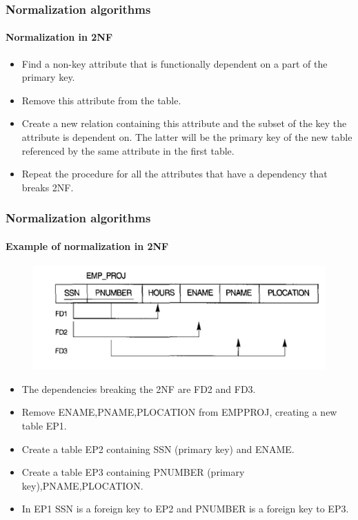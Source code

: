 \documentclass{beamer}
\begin{document}
\begin{frame}
	\frametitle{Normalization algorithms}
	\framesubtitle{Normalization in 2NF}
	
	\begin{itemize}
		\item Find a non-key attribute that is functionally dependent on a part of the primary key.
		\item Remove this attribute from the table.
		\item Create a new relation containing this attribute and the subset of the key the attribute is dependent on. The latter will be the primary key of the new table referenced by the same attribute in the first table.
		\item Repeat the procedure for all the attributes that have a dependency that breaks 2NF.		
	\end{itemize}
\end{frame}

\begin{frame}
	\frametitle{Normalization algorithms}
	\framesubtitle{Example of normalization in 2NF}
	
	\begin{figure}
		\includegraphics[scale=0.5]{img/normalization/norm15}
	\end{figure}
	
	\begin{itemize}
		\item The dependencies breaking the 2NF are FD2 and FD3.
		\item Remove ENAME,PNAME,PLOCATION from EMP\textunderscore PROJ, creating a new table EP1.
		\item Create a table EP2 containing SSN (primary key) and ENAME.
		\item Create a table EP3 containing PNUMBER (primary key),PNAME,PLOCATION.
		\item In EP1 SSN is a foreign key to EP2 and PNUMBER is a foreign key to EP3.		
	\end{itemize}
\end{frame}
\end{document}
